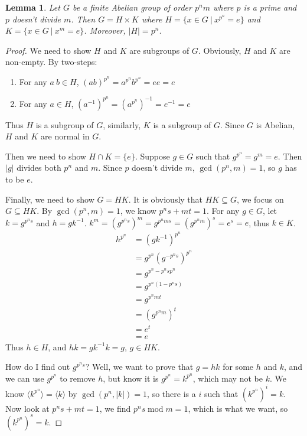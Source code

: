 \documentclass[14pt]{extarticle}
\newtheorem{lemma}{Lemma}[section]
\newcommand{\inv}[1]{#1^{-1}}
\newcommand{\1}{\{e\}}
\DeclareMathOperator{\modu}{mod}
\begin{document}
\begin{lemma}
  Let $G$ be a finite Abelian group of order $p^nm$ where $p$ is a prime 
  and $p$ doesn't divide $m$. Then $G = H \times K$ where
  $H = \{ x \in G \ | \ x^{p^n} = e \}$ and
  $K = \{ x \in G \ | \ x^m = e \}$.
  Moreover, $|H| = p^n$.
\end{lemma}
\begin{proof}
  We need to show $H$ and $K$ are subgroups of $G$. Obviously,
  $H$ and $K$ are non-empty. By two-steps:
  \begin{enumerate}
    \item For any $a \ b \in H$, $(ab)^{p^n} = a^{p^n}b^{p^n} = ee = e$
    \item For any $a \in H$, $(\inv{a})^{p^n} = \inv{(a^{p^n})} = \inv{e} = e$
  \end{enumerate}
  Thus $H$ is a subgroup of $G$, similarly, $K$ is a subgroup of $G$.
  Since $G$ is Abelian, $H$ and $K$ are normal in $G$.

  Then we need to show $H \cap K = \1$. Suppose $g \in G$ such that $g^{p^n} = g^m = e$.
  Then $|g|$ divides both $p^n$ and $m$. Since $p$ doesn't divide $m$, $\gcd(p^n, m) = 1$,
  so $g$ has to be $e$.

  Finally, we need to show $G = HK$. It is obviously that $HK \subseteq G$,
  we focus on $G \subseteq HK$.
  By $\gcd(p^n, m) = 1$, we know $p^ns + mt = 1$. For any $g \in G$,
  let $k = g^{p^ns}$ and $h = g\inv{k}$.
  $k^m = (g^{p^ns})^m = g^{p^nms} = (g^{p^nm})^s = e^s = e$, thus $k \in K$.
  \begin{align*}
    h^{p^n} &= (g\inv{k})^{p^n} \\
    &= g^{p^n}(g^{-p^ns})^{p^n} \\
    &= g^{p^n - p^nsp^n} \\
    &= g^{p^n(1 - p^ns)} \\
    &= g^{p^n mt} \\
    &= (g^{p^nm})^t \\
    &= e^t \\
    &= e
  \end{align*}
  Thus $h \in H$, and $hk = g\inv{k}k = g$, $g \in HK$.

  How do I find out $g^{p^ns}$? Well, 
  we want to prove that $g = hk$ for some $h$ and $k$,
  and we can use $g^{p^n}$ to remove $h$, but know it is $g^{p^n} = k^{p^n}$,
  which may not be $k$. We know
  $\langle k^{p^n} \rangle = \langle k \rangle$ by $\gcd(p^n, |k|) = 1$,
  so there is a $i$ such that $(k^{p^n})^i = k$. Now look at $p^ns + mt = 1$,
  we find $p^ns \modu m = 1$, which is what we want, so $(k^{p^n})^s = k$.
  

\end{proof}
\end{document}
